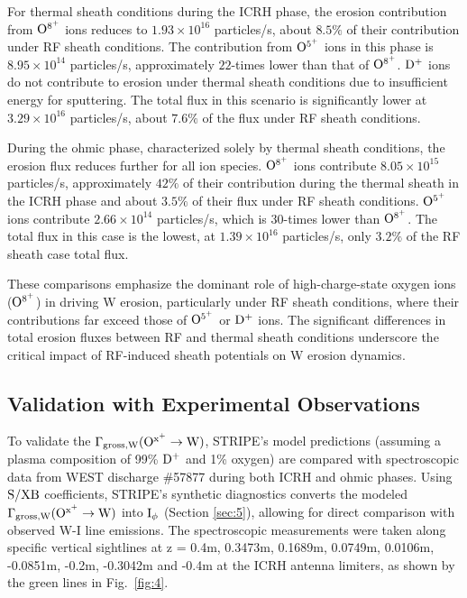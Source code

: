 \documentclass[10pt]{iopart}
\begin{document}
For thermal sheath conditions during the ICRH phase, the erosion contribution from \(\rm O^{8^+}\) ions reduces to \(1.93 \times 10^{16}\) particles/s, about \(8.5\%\) of their contribution under RF sheath conditions. The contribution from \(\rm O^{5^+}\) ions in this phase is \(8.95 \times 10^{14}\) particles/s, approximately \(22\)-times lower than that of \(\rm O^{8^+}\). $\rm D^+$ ions do not contribute to erosion under thermal sheath conditions due to insufficient energy for sputtering. The total flux in this scenario is significantly lower at \(3.29 \times 10^{16}\) particles/s, about \(7.6\%\) of the flux under RF sheath conditions.

During the ohmic phase, characterized solely by thermal sheath conditions, the erosion flux reduces further for all ion species. \(\rm O^{8^+}\) ions contribute \(8.05 \times 10^{15}\) particles/s, approximately \(42\%\) of their contribution during the thermal sheath in the ICRH phase and about \(3.5\%\) of their flux under RF sheath conditions. \(\rm O^{5^+}\) ions contribute \(2.66 \times 10^{14}\) particles/s, which is \(30\)-times lower than \(\rm O^{8^+}\). The total flux in this case is the lowest, at \(1.39 \times 10^{16}\) particles/s, only \(3.2\%\) of the RF sheath case total flux.

These comparisons emphasize the dominant role of high-charge-state oxygen ions (\(\rm O^{8^+}\)) in driving W erosion, particularly under RF sheath conditions, where their contributions far exceed those of \(\rm O^{5^+}\) or $\rm D^+$ ions. The significant differences in total erosion fluxes between RF and thermal sheath conditions underscore the critical impact of RF-induced sheath potentials on W erosion dynamics.


\subsection{Validation with Experimental Observations}
To validate the $\rm  \Gamma_{{gross, W}}(O^{x^+} \rightarrow W)$, STRIPE’s model predictions (assuming a plasma composition of 99\% $\rm D^+$ and 1\% oxygen) are compared with spectroscopic data from WEST discharge \#57877 during both ICRH and ohmic phases. Using $\rm S/XB$ coefficients, STRIPE’s synthetic diagnostics converts the modeled $\rm  \Gamma_{{gross, W}}(O^{x^+} \rightarrow W)$ into $\rm I_\phi$ (Section \ref{sec:5}), allowing for direct comparison with observed W-I line emissions. The spectroscopic measurements were taken along specific vertical sightlines at z = 0.4m, 0.3473m, 0.1689m, 0.0749m, 0.0106m, -0.0851m, -0.2m, -0.3042m and  -0.4m at the ICRH antenna limiters, as shown by the green lines in Fig.~\ref{fig:4}.
\end{document}

